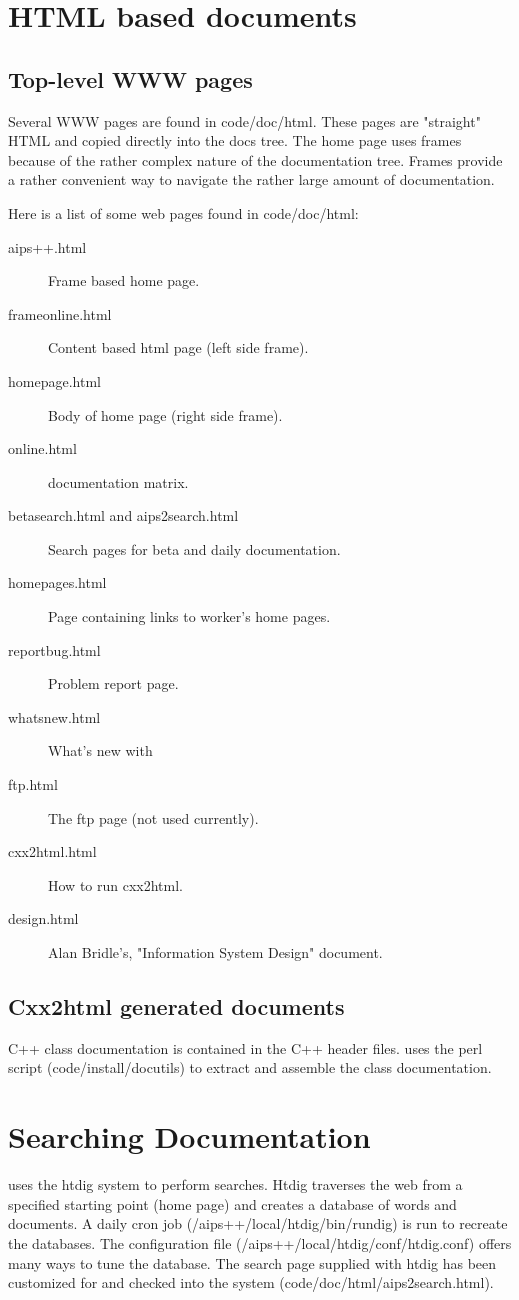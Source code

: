 \section{HTML based documents}
\subsection{Top-level WWW pages}
Several WWW pages are found in code/doc/html.  These pages are "straight" HTML
and copied directly into the docs tree.  The \aips home page uses frames because
of the rather complex nature of the documentation tree.  Frames provide a rather
convenient way to navigate the rather large amount of \aips documentation.

Here is a list of some \aips web pages found in code/doc/html:

\begin{description}
\item[aips++.html] Frame based \aips home page.
\item[frameonline.html] Content based html page (left side frame).
\item[homepage.html] Body of \aips home page (right side frame).
\item[online.html] \aips documentation matrix.
\item[betasearch.html and aips2search.html] Search pages for beta and daily documentation.
\item[homepages.html] Page containing links to \aips worker's home pages.
\item[reportbug.html] Problem report page.
\item[whatsnew.html] What's new with \aips
\item[ftp.html] The ftp page (not used currently).
\item[cxx2html.html] How to run cxx2html.
\item[design.html] Alan Bridle's, "\aips Information System Design" document. 
\end{description}


\subsection{Cxx2html generated documents}
C++ class documentation is contained in the C++ header files. \aips uses 
the perl script
 (code/install/docutils) to
extract and assemble the class documentation.

\section{Searching \aips Documentation}
\aips uses the htdig system  to perform searches.
Htdig traverses the web from a specified starting point (\aips home
page) and creates a database of words and documents.  A daily cron job
(/aips++/local/htdig/bin/rundig) is run
to recreate the databases.  The configuration file
(/aips++/local/htdig/conf/htdig.conf)
offers many ways to tune the database.  The search page supplied with
htdig has been customized for \aips and checked into the system
(code/doc/html/aips2search.html). 

